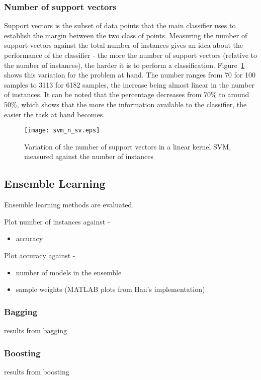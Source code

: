 \subsubsection{Number of support vectors}
Support vectors is the subset of data points that the main classifier uses to establish the margin between the two class of points. Measuring the number of support vectors against the total number of instances gives an idea about the performance of the classifier - the more the number of support vectors (relative to the number of instances), the harder it is to perform a classification. Figure~\ref{svm_n_sv} shows this variation for the problem at hand. The number ranges from 70 for 100 samples to 3113 for 6182 samples, the increase being almost linear in the number of instances. It can be noted that the percentage decreases from 70\% to around 50\%, which shows that the more the information available to the classifier, the easier the task at hand becomes.
\begin{figure}
    \centering
    \texttt{[image: svm\_n\_sv.eps]}
    \caption{Variation of the number of support vectors in a linear kernel SVM, measured against the number of instances}
    \label{svm_n_sv}
\end{figure}

\subsection{Ensemble Learning}
Ensemble learning methods are evaluated.

Plot number of instances against -
\begin{itemize}
    \item{accuracy}
\end{itemize}

Plot accuracy against -
\begin{itemize}
    \item{number of models in the ensemble}
    \item{sample weights (MATLAB plots from Han's implementation)}
\end{itemize}

\subsubsection{Bagging}
results from bagging

\subsubsection{Boosting}
results from boosting

